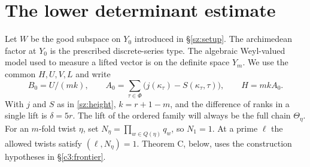 \section{The lower determinant estimate}\label{c3:section}

Let $W$ be the good subspace on $Y_0$ introduced in
\S\ref{sz:setup}. The archimedean factor at $Y_0$
is the prescribed discrete-series type. The algebraic Weyl-valued
model used to measure a lifted vector is on the definite space $Y_m$.
We use the common $H,U,V,L$ and write
\[
 B_0=U/(mk),\qquad
 A_0=\sum_{\tau\in\Phi}
   \bigl(j(\kappa_\tau)-
          S(\kappa_\tau,\tau)\bigr),\qquad H=mk A_0.
\]
With $j$ and $S$ as in \eqref{sz:height},
$k=r+1-m$, and the difference of ranks in a single lift is
$\delta=5r$. The lift of the ordered family will always be the full
chain $\Theta_\eta$. For an $m$-fold twist $\eta$, set
$N_\eta=\prod_{w\in Q(\eta)}q_w$, so $N_1=1$. At a prime $\ell$
the allowed twists satisfy $(\ell,N_\eta)=1$.
Theorem C, below, uses the construction hypotheses in
\S\ref{c3:frontier}.

